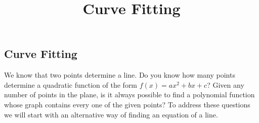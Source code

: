 \documentclass{ximera}
\title{Curve Fitting} \license{CC BY-NC-SA 4.0}
\begin{document}
\begin{abstract}
\end{abstract}
\maketitle

\begin{onlineOnly}
\section*{Curve Fitting}
\end{onlineOnly}

 


We know that two points determine a line.  Do you know how many points determine a quadratic function of the form $f(x)=ax^2+bx+c$?  Given any number of points in the plane, is it always possible to find a polynomial function whose graph contains every one of the given points?  To address these questions we will start with an alternative way of finding an equation of a line.
\end{document}
